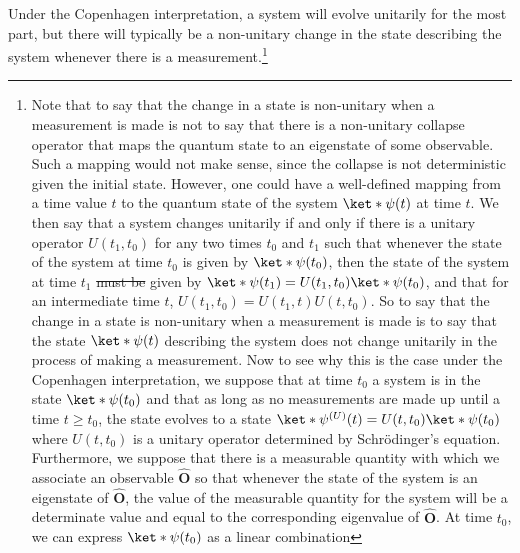 \documentclass[12pt]{report}
\providecommand{\DIFadd}[1]{{\protect\color{blue}\uwave{#1}}} %
\providecommand{\DIFdel}[1]{{\protect\color{red}\sout{#1}}}                      %
\providecommand{\DIFaddbegin}{} %
\providecommand{\DIFaddend}{} %
\providecommand{\DIFdelbegin}{} %
\providecommand{\DIFdelend}{} %
\begin{document}
Under the Copenhagen interpretation, a system will evolve unitarily for the most part, but there will typically be a non-unitary change in the state describing the system whenever there is a measurement.\footnote{Note that to say that the change in a state is non-unitary when a measurement is made is not to say that there is a non-unitary collapse operator that maps the quantum state to an eigenstate of some observable. Such a mapping would not make sense, since the collapse is not deterministic given the initial state. However, one could have a well-defined mapping from a time value $t$ to the quantum state of the system $\ket*{\psi(t)}$ %
\DIFdelbegin %
\DIFdelend \DIFaddbegin {}\DIFaddend %
 at time $t$. We then say that a system changes unitarily if and only if there is a unitary operator $U(t_1,t_0)$ for any two times $t_0$ and $t_1$ such that whenever the state of the system at time $t_0$ is given by $\ket*{\psi(t_0)}$, then the state of the system at time $t_1$ \DIFdelbegin \DIFdel{must be }\DIFdelend \DIFaddbegin \DIFadd{is }\DIFaddend given by $\ket*{\psi(t_1)}=U(t_1, t_0)\ket*{\psi(t_0)}$, and that for an intermediate time $t$, $U(t_1,t_0)=U(t_1, t)U(t, t_0).$ So to say that the change in a state is non-unitary when a measurement is made is to say that the state $\ket*{\psi(t)}$ describing the system does not change unitarily in the process of making a measurement. Now to see why this is the case under the Copenhagen interpretation, we suppose that at time $t_0$ a system is in the state $\ket*{\psi(t_0)}$ and that as long as no measurements are made up until a time $t\geq t_0$, the state evolves to a state $\ket*{\psi^{(U)}(t)}=U(t,t_0)\ket*{\psi(t_0)}$  %
%
 where $U(t,t_0)$ is a unitary operator determined by Schr\"{o}dinger's equation. Furthermore, we suppose that there is a measurable quantity with which we associate an observable $\hat{\bm{O}}$ so that whenever the state of the system is an eigenstate of $\hat{\bm{O}}$, the value of the measurable quantity for the system will be a determinate value and equal to the corresponding eigenvalue of $\hat{\bm{O}}$. At time $t_0$, we can express $\ket*{\psi(t_0)}$ as a linear combination
}
\end{document}
